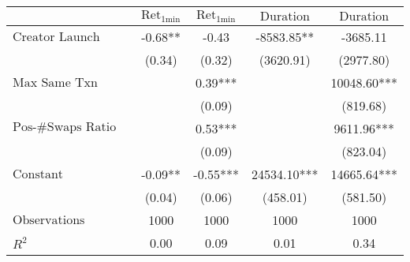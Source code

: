 \begin{tabular}{lcccc}
\hline
 & $\text{Ret}_{\text{1min}}$ & $\text{Ret}_{\text{1min}}$ & $\text{Duration}$ & $\text{Duration}$ \\
\hline
$\text{Creator Launch Bundle}$ & -0.68** & -0.43 & -8583.85** & -3685.11 \\
 & (0.34) & (0.32) & (3620.91) & (2977.80) \\
$\text{Max Same Txn}$ &  & 0.39*** &  & 10048.60*** \\
 &  & (0.09) &  & (819.68) \\
$\text{Pos-\#Swaps Ratio}$ &  & 0.53*** &  & 9611.96*** \\
 &  & (0.09) &  & (823.04) \\
$\text{Constant}$ & -0.09** & -0.55*** & 24534.10*** & 14665.64*** \\
 & (0.04) & (0.06) & (458.01) & (581.50) \\
$\text{Observations}$ & 1000 & 1000 & 1000 & 1000 \\
$R^2$ & 0.00 & 0.09 & 0.01 & 0.34 \\
\hline
\end{tabular}